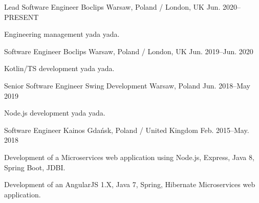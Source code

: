 
\begin{cventries}

  \cventry
    {Lead Software Engineer} %
    {Boclips} %
    {Warsaw, Poland / London, UK} %
    {Jun. 2020–PRESENT} %
    {
      \begin{cvitems} %
        \item {Engineering management yada yada.}
      \end{cvitems}
    }

  \cventry
    {Software Engineer} %
    {Boclips} %
    {Warsaw, Poland / London, UK} %
    {Jun. 2019–Jun. 2020} %
    {
      \begin{cvitems} %
        \item {Kotlin/TS development yada yada.}
      \end{cvitems}
    }

  \cventry
    {Senior Software Engineer} %
    {Swing Development} %
    {Warsaw, Poland} %
    {Jun. 2018–May 2019} %
    {
      \begin{cvitems} %
        \item {Node.js development yada yada.}
      \end{cvitems}
    }

  \cventry
    {Software Engineer} %
    {Kainos} %
    {Gdańsk, Poland / United Kingdom} %
    {Feb. 2015–May. 2018} %
    {
      \begin{cvitems} %
        \item {Development of a Microservices web application using Node.js, Express, Java 8, Spring Boot, JDBI.}
        \item {Development of an AngularJS 1.X, Java 7, Spring, Hibernate Microservices web application.}
      \end{cvitems}
    }


\end{cventries}
